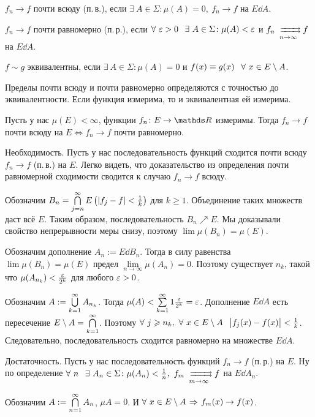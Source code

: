 \begin{Def}
 $f_n\to f$ почти всюду (п.\,в.), если $\exists\ A\in\Sigma\colon \mu(A)=0,\ f_n\to f$ на $E\dd A$.
\end{Def}
\begin{Def}
 $f_n\to f$ почти равномерно (п.\,р.), если $\forall\ \e>0\pau \exists\ A\in\Sigma\colon \mu(A)<\e$ и $f_n\rsh[]n f$ на $E\dd A$.
\end{Def}
\begin{Def}
  $f\sim g $ эквивалентны, если $\exists\ A\in\Sigma\colon \mu(A)=0$ и $f(x)\equiv g(x)\pau \forall\ x\in E\dd A$.
\end{Def} 
Пределы почти всюду и почти равномерно определяются с точностью до эквивалентности. Если функция измерима, то и эквивалентная ей измерима.

\begin{The}[Егорова]
  Пусть у нас $\mu(E)<\infty$, функции $f_n\colon E\to\R$ измеримы. Тогда $f_n\to f$ почти всюду на $E\iff f_n\to f$ почти равномерно.
\end{The}

\begin{Proof}
  Необходимость. Пусть у нас последовательность функций сходится почти всюду $f_n\to f$ (п.\,в.) на $E$. Легко видеть, что доказательство из определения почти равномерной сходимости сводится к случаю $f_n\to f$ всюду.

Обозначим $B_n = \bigcap\limits_{j=n}^\infty E\left(|f_j-f|<\frac 1k\right)$ для $k\ge 1$. Объединение таких множеств даст всё $E$. Таким образом, последовательность $B_n\nearrow E$. Мы доказывали свойство непрерывности меры снизу, поэтому $\lim\mu(B_n)=\mu(E)$.

Обозначим дополнение $A_n:=E\dd B_n$. Тогда в силу равенства $\lim\mu(B_n)=\mu(E)$ предел $\lim\limits_{n\to\infty}\mu(A_n)=0$. Поэтому существует $n_k$, такой что $\mu(A_{n_k})<\frac{\varepsilon}{2^k}$ для любого $\varepsilon>0$.

Обозначим $A:=\bigcup\limits_{k=1}^\infty A_{n_k}$. Тогда $\mu(A) < \sum\limits_{{k}={1}}^\infty1\frac{\varepsilon}{2^k} = \varepsilon$. Дополнение $E\dd A$ есть пересечение $E\setminus A = \bigcap\limits_{k=1}^\infty$. Поэтому $\forall\ j\geqslant n_k,\ \forall\ x\in E\setminus A\hskip .75em plus.1em minus.08em\relax \big|f_j(x)-f(x)\big|<\frac1k$. Следовательно, последовательность сходится равномерно на множестве $E\dd A$.

Достаточность. Пусть у нас последовательность функций $f_n\to f$ (п.\,р.) на $E$. Ну по определение
$\forall\ n\pau \exists\ A_n\in\Sigma\colon \mu(A_n)<\frac1n,\ f_m\rsh[]mf$ на $E\dd A_n$.

Обозначим $A:= \bigcap\limits_{n=1}^\infty A_n$, $\mu A=0$. И $\forall\ x\in E\dd A\imp f_m(x)\to f(x)$.
\end{Proof}


